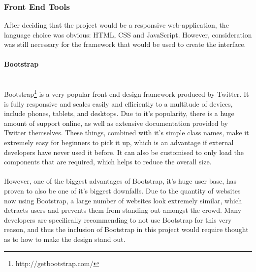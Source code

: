 \subsubsection{Front End Tools}
After deciding that the project would be a responsive web-application, the language choice was obvious: HTML, CSS and JavaScript. However, consideration was still necessary for the framework that would be used to create the interface.

\paragraph{Bootstrap}\ \\
Bootstrap\footnote{http://getbootstrap.com/} is a very popular front end design framework produced by Twitter. It is fully responsive and scales easily and efficiently to a multitude of devices, include phones, tablets, and desktops. Due to it's popularity, there is a huge amount of support online, as well as extensive documentation provided by Twitter themselves. These things, combined with it's simple class names, make it extremely easy for beginners to pick it up, which is an advantage if external developers have never used it before. It can also be customised to only load the components that are required, which helps to reduce the overall size.\ \\
\ \\
However, one of the biggest advantages of Bootstrap, it's huge user base, has proven to also be one of it's biggest downfalls. Due to the quantity of websites now using Bootstrap, a large number of websites look extremely similar, which detracts users and prevents them from standing out amongst the crowd. Many developers are specifically recommending to not use Bootstrap for this very reason\cite{gross2013bootstrap}, and thus the inclusion of Bootstrap in this project would require thought as to how to make the design stand out.

